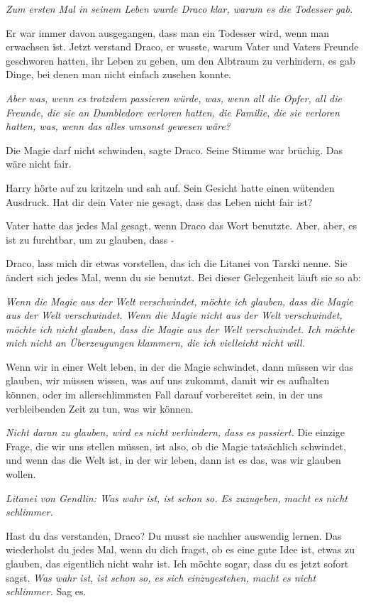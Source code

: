 \emph{Zum ersten Mal in seinem Leben wurde Draco klar, warum es die Todesser
gab. }

Er war immer davon ausgegangen, dass man ein Todesser wird, wenn man erwachsen
ist. Jetzt verstand Draco, er wusste, warum Vater und Vaters Freunde geschworen
hatten, ihr Leben zu geben, um den Albtraum zu verhindern, es gab Dinge, bei
denen man nicht einfach zusehen konnte.

\emph{Aber was, wenn es trotzdem passieren würde, was, wenn all die Opfer, all
die Freunde, die sie an Dumbledore verloren hatten, die Familie, die sie
verloren hatten, was, wenn das alles umsonst gewesen wäre? }

\glqq Die Magie darf nicht schwinden\grqq{}, sagte Draco. Seine Stimme war
brüchig. \glqq Das wäre nicht fair.\grqq{}

Harry hörte auf zu kritzeln und sah auf. Sein Gesicht hatte einen wütenden
Ausdruck. \glqq Hat dir dein Vater nie gesagt, dass das Leben nicht fair
ist?\grqq{}

Vater hatte das jedes Mal gesagt, wenn Draco das Wort benutzte. \glqq Aber,
aber, es ist zu furchtbar, um zu glauben, dass -\grqq{}

\glqq Draco, lass mich dir etwas vorstellen, das ich die Litanei von Tarski
nenne. Sie ändert sich jedes Mal, wenn du sie benutzt. Bei dieser Gelegenheit
läuft sie so ab:

\emph{Wenn die Magie aus der Welt verschwindet, möchte ich glauben, dass die
Magie aus der Welt verschwindet. Wenn die Magie nicht aus der Welt verschwindet,
möchte ich nicht glauben, dass die Magie aus der Welt verschwindet. Ich möchte
mich nicht an Überzeugungen klammern, die ich vielleicht nicht will.}

Wenn wir in einer Welt leben, in der die Magie schwindet, dann müssen wir das
glauben, wir müssen wissen, was auf uns zukommt, damit wir es aufhalten können,
oder im allerschlimmsten Fall darauf vorbereitet sein, in der uns verbleibenden
Zeit zu tun, was wir können.

\emph{Nicht daran zu glauben, wird es nicht verhindern, dass es passiert.}
Die einzige Frage, die wir uns stellen müssen, ist also, ob die Magie
tatsächlich schwindet, und wenn das die Welt ist, in der wir leben, dann ist es
das, was wir glauben wollen.

\emph{Litanei von Gendlin: Was wahr ist, ist schon so. Es zuzugeben, macht es
nicht schlimmer.}

Hast du das verstanden, Draco? Du musst sie nachher auswendig lernen. Das
wiederholst du jedes Mal, wenn du dich fragst, ob es eine gute Idee ist, etwas
zu glauben, das eigentlich nicht wahr ist. Ich möchte sogar, dass du es jetzt
sofort sagst. \emph{Was wahr ist, ist schon so, es sich einzugestehen, macht es
nicht schlimmer. }Sag es.\grqq{}

